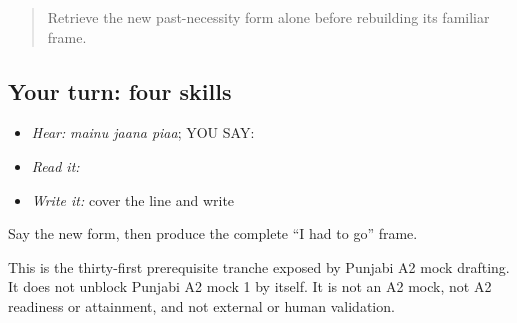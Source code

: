 \label{lesson:PA-C208-payoff}



\begin{quote}
Retrieve the new past-necessity form alone before rebuilding its familiar frame.
\end{quote}

\subsection*{Your turn: four skills}
\begin{itemize}
\raggedright
  \item \emph{Hear:} \emph{mainu jaana piaa}; YOU SAY: \textbf{  }
  \item \emph{Read it:} \textbf{  }
  \item \emph{Write it:} cover the line and write \textbf{  }
\end{itemize}

\begin{tcolorbox}[breakable,colback=teal!4,colframe=teal!35!black,title={Before you move on}]
Say the new form, then produce the complete “I had to go” frame.

This is the thirty-first prerequisite tranche exposed by Punjabi A2 mock drafting. It does not unblock Punjabi A2 mock 1 by itself. It is not an A2 mock, not A2 readiness or attainment, and not external or human validation.
\end{tcolorbox}
